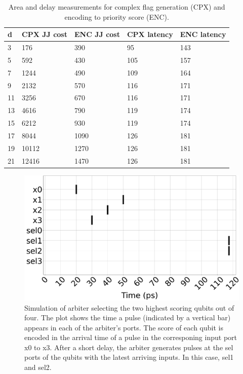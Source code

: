 \begin{table}[]
\caption{Area and delay measurements for complex flag generation (CPX) and encoding to priority score (ENC).}
\label{tab:encoderstats}
\begin{tabular}{|l|l|l|l|l|}
\hline
d  & CPX JJ cost & ENC JJ cost & CPX latency & ENC latency \\ \hline
3  & 176         & 390         & 95          & 143         \\ \hline
5  & 592         & 430         & 105         & 157         \\ \hline
7  & 1244        & 490         & 109         & 164         \\ \hline
9  & 2132        & 570         & 116         & 171         \\ \hline
11 & 3256        & 670         & 116         & 171         \\ \hline
13 & 4616        & 790         & 119         & 174         \\ \hline
15 & 6212        & 930         & 119         & 174         \\ \hline
17 & 8044        & 1090        & 126         & 181         \\ \hline
19 & 10112       & 1270        & 126         & 181         \\ \hline
21 & 12416       & 1470        & 126         & 181         \\ \hline
\end{tabular}
\end{table}

\begin{figure}
  \begin{center}
    \includegraphics[width=\columnwidth]{figures/simlarge.pdf}
  \end{center}
  \caption{Simulation of arbiter selecting the two highest scoring qubits out of four. The plot shows the time a pulse (indicated by a vertical bar) appears in each of the arbiter's ports. The score of each qubit is encoded in the arrival time of a pulse in the corresponing input port x0 to x3. After a short delay, the arbiter generates pulses at the sel ports of the qubits with the latest arriving inputs. In this case, sel1 and sel2.}\label{fig:pylserun}
\end{figure}

